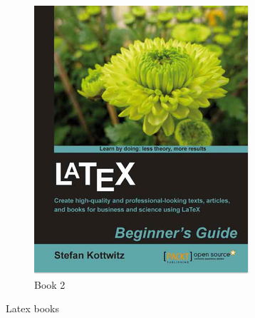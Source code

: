 \documentclass[a4paper,twoside,10pt]{article}
\begin{document}
\begin{figure}
\begin{subfigure}{0.4\linewidth}
			\includegraphics[width=\linewidth]{img/img2.png}
			\caption{Book 2}
		\end{subfigure}
		\caption{Latex books}
	\end{figure}
	
	\newpage
	\appendix
	\listoffigures
	\listoftables
\end{document}
